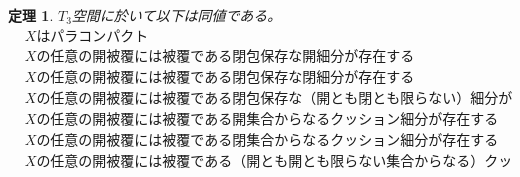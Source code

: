 \documentclass[leqno]{jsarticle}
\newtheorem{thm}{定理}
\begin{document}
%
\begin{thm}
$T_3$空間に於いて以下は同値である。
\begin{align}
&\mbox{$X$はパラコンパクト}\\
&\mbox{$X$の任意の開被覆には被覆である閉包保存な開細分が存在する}\\
&\mbox{$X$の任意の開被覆には被覆である閉包保存な閉細分が存在する}\\
&\mbox{$X$の任意の開被覆には被覆である閉包保存な（開とも閉とも限らない）細分が存在する}\\
&\mbox{$X$の任意の開被覆には被覆である開集合からなるクッション細分が存在する}\\
&\mbox{$X$の任意の開被覆には被覆である閉集合からなるクッション細分が存在する}\\
&\mbox{$X$の任意の開被覆には被覆である（開とも開とも限らない集合からなる）クッション細分が存在する}
\end{align}
\end{thm}
\end{document}
